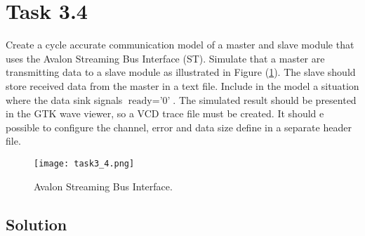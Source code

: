 \documentclass[../main.tex]{subfiles}
\begin{document}
\section{Task 3.4}

Create a cycle accurate communication model of a master and slave module that uses the Avalon Streaming Bus Interface (ST). Simulate that a master are transmitting data to a slave module as illustrated in Figure (\ref{fig:avalon}). The slave should store received data from the master in a text file. Include in the model a situation where the data sink signals $\text{ready} = \text{'0'}$. The simulated result should be presented in the GTK wave viewer, so a VCD trace file must be created. It should e possible to configure the channel, error and data size define in a separate header file.

\begin{figure}[h]
    \centering
    \texttt{[image: task3\_4.png]}
    \caption{Avalon Streaming Bus Interface.}
    \label{fig:avalon}
\end{figure}

\subsection*{Solution}
\end{document}
